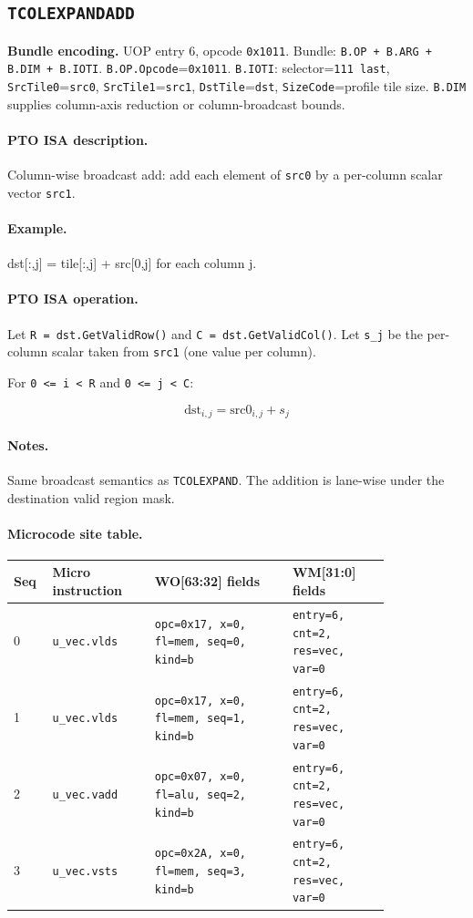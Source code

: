 \subsection{\texttt{TCOLEXPANDADD}}
\noindent\textbf{Bundle encoding.} UOP entry 6, opcode \texttt{0x1011}. Bundle: \texttt{B.OP + B.ARG + B.DIM + B.IOTI}. \texttt{B.OP.Opcode}=\texttt{0x1011}. \texttt{B.IOTI}: selector=\texttt{111 last}, \texttt{SrcTile0}=\texttt{src0}, \texttt{SrcTile1}=\texttt{src1}, \texttt{DstTile}=\texttt{dst}, \texttt{SizeCode}=profile tile size. \texttt{B.DIM} supplies column-axis reduction or column-broadcast bounds.\par\smallskip
{\small
\paragraph{PTO ISA description.}
Column-wise broadcast add: add each element of \texttt{src0} by a per-column scalar vector \texttt{src1}.
\paragraph{Example.}
dst[:,j] = tile[:,j] + src[0,j] for each column j.
\par\smallskip
\paragraph{PTO ISA operation.}
Let \texttt{R = dst.GetValidRow()} and \texttt{C = dst.GetValidCol()}. Let \texttt{s\_j} be the per-column scalar taken from \texttt{src1} (one value per column).

For \texttt{0 \textless{}= i \textless{} R} and \texttt{0 \textless{}= j \textless{} C}:

\[
\mathrm{dst}_{i,j} = \mathrm{src0}_{i,j} + s_j
\]
}\par\smallskip
\paragraph{Notes.}
Same broadcast semantics as \texttt{TCOLEXPAND}. The addition is lane-wise under the destination valid region mask.
\paragraph{Microcode site table.}
{\scriptsize
\begin{longtable}{@{}R{0.055\linewidth}L{0.23\linewidth}L{0.31\linewidth}L{0.22\linewidth}@{}}
\toprule
Seq & Micro instruction & WO[63:32] fields & WM[31:0] fields \\
 & \texttt{u\_vec.vlds} & \texttt{opc=0x17, x=0, fl=mem, seq=0, kind=b} & \texttt{entry=6, cnt=2, res=vec, var=0} \\
1 & \texttt{u\_vec.vlds} & \texttt{opc=0x17, x=0, fl=mem, seq=1, kind=b} & \texttt{entry=6, cnt=2, res=vec, var=0} \\
2 & \texttt{u\_vec.vadd} & \texttt{opc=0x07, x=0, fl=alu, seq=2, kind=b} & \texttt{entry=6, cnt=2, res=vec, var=0} \\
3 & \texttt{u\_vec.vsts} & \texttt{opc=0x2A, x=0, fl=mem, seq=3, kind=b} & \texttt{entry=6, cnt=2, res=vec, var=0} \\
\bottomrule
\end{longtable}
}
